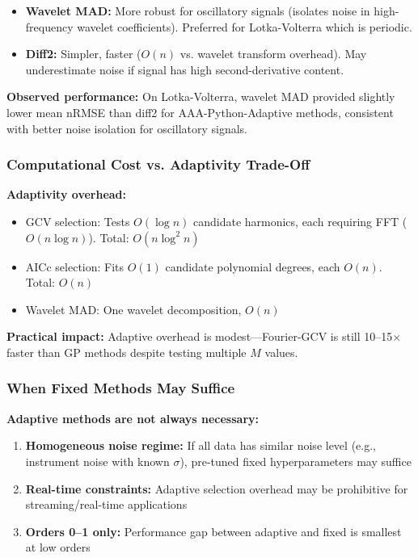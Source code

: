 \begin{itemize}
    \item \textbf{Wavelet MAD:} More robust for oscillatory signals (isolates noise in high-frequency wavelet coefficients). Preferred for Lotka-Volterra which is periodic.
    \item \textbf{Diff2:} Simpler, faster ($O(n)$ vs. wavelet transform overhead). May underestimate noise if signal has high second-derivative content.
\end{itemize}

\textbf{Observed performance:} On Lotka-Volterra, wavelet MAD provided slightly lower mean nRMSE than diff2 for AAA-Python-Adaptive methods, consistent with better noise isolation for oscillatory signals.

\subsubsection{Computational Cost vs. Adaptivity Trade-Off}

\textbf{Adaptivity overhead:}
\begin{itemize}
    \item GCV selection: Tests $O(\log n)$ candidate harmonics, each requiring FFT ($O(n \log n)$). Total: $O(n \log^2 n)$
    \item AICc selection: Fits $O(1)$ candidate polynomial degrees, each $O(n)$. Total: $O(n)$
    \item Wavelet MAD: One wavelet decomposition, $O(n)$
\end{itemize}

\textbf{Practical impact:} Adaptive overhead is modest—Fourier-GCV is still 10--15$\times$ faster than GP methods despite testing multiple $M$ values.

\subsubsection{When Fixed Methods May Suffice}

\textbf{Adaptive methods are not always necessary:}
\begin{enumerate}
    \item \textbf{Homogeneous noise regime:} If all data has similar noise level (e.g., instrument noise with known $\sigma$), pre-tuned fixed hyperparameters may suffice
    \item \textbf{Real-time constraints:} Adaptive selection overhead may be prohibitive for streaming/real-time applications
    \item \textbf{Orders 0--1 only:} Performance gap between adaptive and fixed is smallest at low orders
\end{enumerate}

